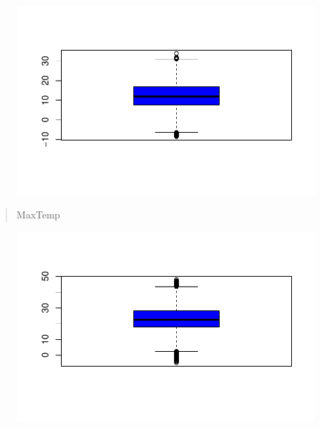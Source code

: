 \documentclass[
  letterpaper,
  DIV=11,
  numbers=noendperiod]{scrartcl}
\newenvironment{Shaded}{\begin{snugshade}}{\end{snugshade}}
\newcommand{\AttributeTok}[1]{\textcolor[rgb]{0.40,0.45,0.13}{#1}}
\newcommand{\FunctionTok}[1]{\textcolor[rgb]{0.28,0.35,0.67}{#1}}
\newcommand{\NormalTok}[1]{\textcolor[rgb]{0.00,0.23,0.31}{#1}}
\newcommand{\SpecialCharTok}[1]{\textcolor[rgb]{0.37,0.37,0.37}{#1}}
\newcommand{\StringTok}[1]{\textcolor[rgb]{0.13,0.47,0.30}{#1}}
\begin{document}
\begin{figure}[H]

{\centering \includegraphics{RainAus_EDA_files/figure-pdf/unnamed-chunk-10-1.pdf}

}

\end{figure}

\begin{quote}
MaxTemp
\end{quote}

\begin{Shaded}
\end{Shaded}

\begin{figure}[H]

{\centering \includegraphics{RainAus_EDA_files/figure-pdf/unnamed-chunk-11-1.pdf}

}

\end{figure}
\end{document}
